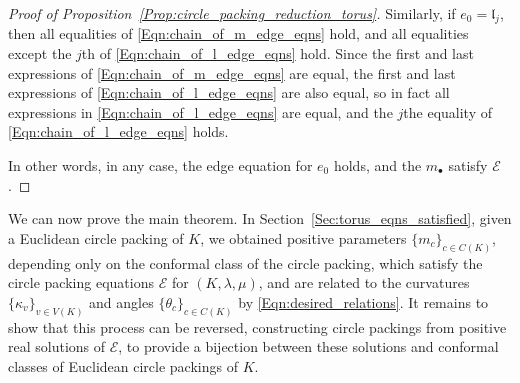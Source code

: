 \documentclass[12pt]{amsart}
\numberwithin{equation}{section}
\theoremstyle{named}
\newcommand{\refsec}[1]{Section~\ref{Sec:#1}}
\newcommand{\refeqn}[1]{\eqref{Eqn:#1}}
\newcommand{\refprop}[1]{Proposition~\ref{Prop:#1}}
\begin{document}
\begin{proof}[Proof of \refprop{circle_packing_reduction_torus}]
Similarly, if $e_0 = \mathfrak{l}_j$, then all equalities of \refeqn{chain_of_m_edge_eqns} hold, and all equalities except the $j$th of \refeqn{chain_of_l_edge_eqns} hold. Since the first and last expressions of \refeqn{chain_of_m_edge_eqns} are equal, the first and last expressions of \refeqn{chain_of_l_edge_eqns} are also equal, so in fact all expressions in \refeqn{chain_of_l_edge_eqns} are equal, and the $j$the equality of \refeqn{chain_of_l_edge_eqns} holds.

In other words, in any case, the edge equation for $e_0$ holds, and the $m_\bullet$ satisfy $\mathcal{E}$.
\end{proof}

We can now prove the main theorem. In \refsec{torus_eqns_satisfied}, given a Euclidean circle packing of $K$, we obtained positive parameters $\{m_c\}_{c \in C(K)}$, depending only on the conformal class of the circle packing, which satisfy the circle packing equations $\mathcal{E}$ for $(K, \lambda, \mu)$, and are related to the curvatures $\{\kappa_v\}_{v \in V(K)}$ and angles $\{\theta_c\}_{c \in C(K)}$ by \refeqn{desired_relations}. It remains to show that this process can be reversed, constructing circle packings from positive real solutions of $\mathcal{E}$, to provide a bijection between these solutions and conformal classes of Euclidean circle packings of $K$.
\end{document}
